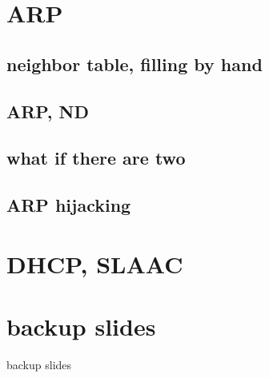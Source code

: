 \section{ARP}

\subsection{neighbor table, filling by hand}


\subsection{ARP, ND}



\subsection{what if there are two}



\subsection{ARP hijacking}




\section{DHCP, SLAAC}

\section{backup slides}
\begin{frame}{backup slides}
\end{frame}


